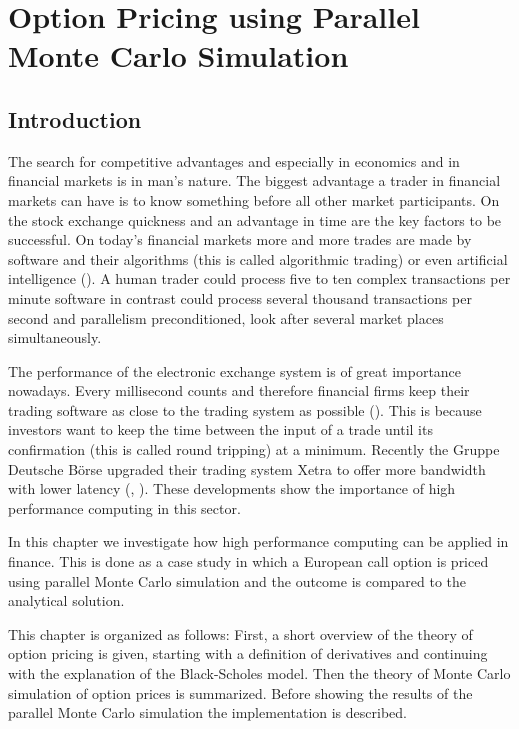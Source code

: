 \chapter[Parallel Monte Carlo Simulation]{Option Pricing using
  Parallel Monte Carlo Simulation}
\label{chap:options}
\section{Introduction}
\label{sec:optionintro}

The search for competitive advantages and especially in economics and in
financial markets is in man's nature. The biggest advantage a trader
in financial markets can have is to know something before all
other market participants. On the stock exchange quickness and an advantage
in time are the key factors to be successful. On today's financial
markets more and more trades are made by software and their
algorithms (this is called algorithmic trading) or even artificial
intelligence (\cite{bloomberg:hal9000}). A human trader could
process five to ten complex 
transactions per minute software in contrast could process several
thousand transactions per second and parallelism preconditioned, look
after several market places simultaneously.


The performance of the electronic exchange system is of great
importance nowadays. Every millisecond counts and therefore financial
firms keep their trading software as close to the trading system as
possible (\cite{wstonline:cuttingedge}). This is because investors
want to keep the time
between the input of a trade until its confirmation (this is called
round tripping) at a minimum. Recently the Gruppe Deutsche B\"orse
upgraded their trading 
system Xetra to offer more bandwidth with lower latency (\cite{gdb:latency},
\cite{gdb:bandwidth}).
These developments show the importance of high performance computing
in this sector.


In this chapter we investigate how high performance computing can be
applied in finance. This is done as a case study in which a
European call option is priced using parallel Monte Carlo
simulation and the outcome is compared to the analytical solution.

This chapter is organized as follows: First, a short overview of the
theory of option pricing is given, starting with a definition of
derivatives and continuing with the explanation of the Black-Scholes
model. Then the theory of Monte Carlo simulation of option prices is
summarized. Before showing the results of the parallel Monte Carlo
simulation the implementation is described.


